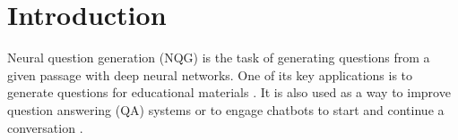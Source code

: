 \documentclass[letterpaper]{article} %
\newcommand{\jb}[1]{\textcolor{cyan}{#1}}
\begin{document}
\section{Introduction}

\noindent Neural question generation (NQG) is the task of generating questions from a given passage with deep neural networks.
One of its key applications is to generate questions for educational materials \cite{heilman2010good}. It is also used as a way to improve question answering (QA) systems \cite{duan2017question,tang2017question,tang2018learning} or to engage chatbots to start and continue a conversation \cite{mostafazadeh2016generating}.
%
%
%
%
%
\end{document}
